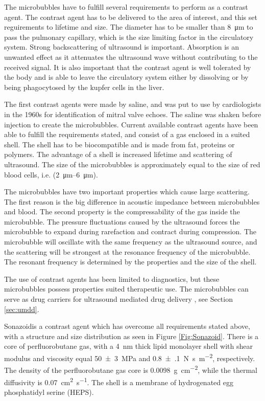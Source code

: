 The microbubbles have to fulfill several requirements to perform as a contrast agent. The contrast agent has to be delivered to the area of interest, and this set reguirements to lifetime and size. The diameter has to be smaller than \SI{8}{\micro\metre} to pass the pulmonary capillary\cite{Tickner1980}, which is the size limiting factor in the circulatory system. Strong backscattering of ultrasound is important. Absorption is an unwanted effect as it attenuates the ultrasound wave without contributing to the received signal. It is also important that the contrast agent is well tolerated by the body and is able to leave the circulatory system either by dissolving or by being phagocytosed by the kupfer cells in the liver\cite{Healey2012}.

The first contrast agents were made by saline, and was put to use by cardiologists in the 1960s for identification of mitral valve echoes. The saline was shaken before injection to create the microbubbles. Current available contrast agents have been able to fulfill the requirements stated, and consist of a gas enclosed in a suited shell. The shell has to be biocompatible and is made from fat, proteins or polymers. The advantage of a shell is increased lifetime and scattering of ultrasound. The size of the microbubbles is approximately equal to the size of red blood cells, i.e. (\SIrange{2}{6}{\micro\metre}).

The microbubbles have two important properties which cause large scattering. The first reason is the big difference in acoustic impedance between microbubbles and blood. The second property is the compressability of the gas inside the microbubble. The pressure fluctuations caused by the ultrasound forces the microbubble to expand during rarefaction and contract during compression. The microbubble will oscillate with the same frequency as the ultrasound source, and the scattering will be strongest at the resonance frequency of the microbubble. The resonant frequency is determined by the properties and the size of the shell.

The use of contrast agents has been limited to diagnostics, but these microbubbles possess properties suited therapeutic use. The microbubbles can serve as drug carriers for ultrasound mediated drug delivery \cite{Dijkmans2004}, see Section \ref{sec:umdd}.

Sonazoid\texttrademark is a contrast agent which has overcome all requirements stated above, with a structure and size distribution as seen in Figure \ref{Fig:Sonazoid}. There is a core of perfluorobutane gas, with a \SI{4}{\nano\meter} thick lipid monolayer shell with shear modulus and viscosity equal \SI{50(3)}{\mega\pascal} and \SI{0.8(1)}{\newton\second\per\meter\squared}, respectively\cite{Hoff2000}. The density of the perfluorobutane gas core is \SI{0.0098}{\gram\per\centi\meter\squared}, while the thermal diffusivity is \SI{0.07}{\centi\meter\squared\per\second}\cite{Healey2012}. The shell is a membrane of hydrogenated egg phosphatidyl serine (HEPS)\cite{Sontum2008}.

